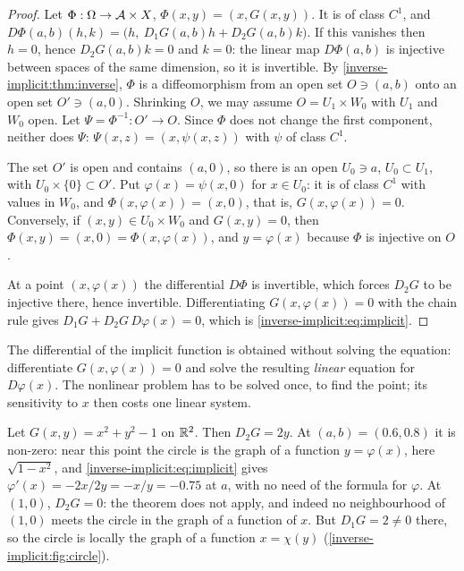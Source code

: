 \begin{notechapter}
\begin{proof}
Let $\Phi:\Omega\to\mathcal{A}\times X$, $\Phi(x, y) = (x, G(x, y))$. It is of
class $C^1$, and
$D\Phi(a, b)(h, k) = \bigl(h,\ D_1G(a, b)h + D_2G(a, b)k\bigr)$. If this
vanishes then $h = 0$, hence $D_2G(a, b)k = 0$ and $k = 0$: the linear map
$D\Phi(a, b)$ is injective between spaces of the same dimension, so it is
invertible. By \cref{inverse-implicit:thm:inverse}, $\Phi$ is a
diffeomorphism from an open set $O\ni(a, b)$ onto an open set
$O'\ni(a, 0)$. Shrinking $O$, we may assume $O = U_1\times W_0$ with
$U_1$ and $W_0$ open. Let $\Psi = \Phi^{-1}:O'\to O$. Since $\Phi$ does
not change the first component, neither does $\Psi$:
$\Psi(x, z) = (x, \psi(x, z))$ with $\psi$ of class $C^1$.

The set $O'$ is open and contains $(a, 0)$, so there is an open
$U_0\ni a$, $U_0\subset U_1$, with $U_0\times\{0\}\subset O'$. Put
$\varphi(x) = \psi(x, 0)$ for $x\in U_0$: it is of class $C^1$ with values
in $W_0$, and $\Phi(x, \varphi(x)) = (x, 0)$, that is,
$G(x, \varphi(x)) = 0$. Conversely, if $(x, y)\in U_0\times W_0$ and
$G(x, y) = 0$, then $\Phi(x, y) = (x, 0) = \Phi(x, \varphi(x))$, and
$y = \varphi(x)$ because $\Phi$ is injective on $O$.

At a point $(x, \varphi(x))$ the differential $D\Phi$ is invertible, which
forces $D_2G$ to be injective there, hence invertible. Differentiating
$G(x, \varphi(x)) = 0$ with the chain rule gives
$D_1G + D_2G\,D\varphi(x) = 0$, which is
\eqref{inverse-implicit:eq:implicit}.
\end{proof}

\begin{keyidea}
The differential of the implicit function is obtained without solving the
equation: differentiate $G(x, \varphi(x)) = 0$ and solve the resulting
\emph{linear} equation for $D\varphi(x)$. The nonlinear problem has to be
solved once, to find the point; its sensitivity to $x$ then costs one
linear system.
\end{keyidea}

\begin{example}\label{inverse-implicit:ex:circle}
Let $G(x, y) = x^2 + y^2 - 1$ on $\mathbb{R}^2$. Then $D_2G = 2y$. At
$(a, b) = (0.6, 0.8)$ it is non-zero: near this point the circle is the
graph of a function $y = \varphi(x)$, here $\sqrt{1 - x^2}$, and
\eqref{inverse-implicit:eq:implicit} gives
$\varphi'(x) = -2x/2y = -x/y = -0.75$ at $a$, with no need of the formula
for $\varphi$. At $(1, 0)$, $D_2G = 0$: the theorem does not apply, and
indeed no neighbourhood of $(1, 0)$ meets the circle in the graph of a
function of $x$. But $D_1G = 2\neq0$ there, so the circle is locally the
graph of a function $x = \chi(y)$
(\cref{inverse-implicit:fig:circle}).
\end{example}


\end{notechapter}
